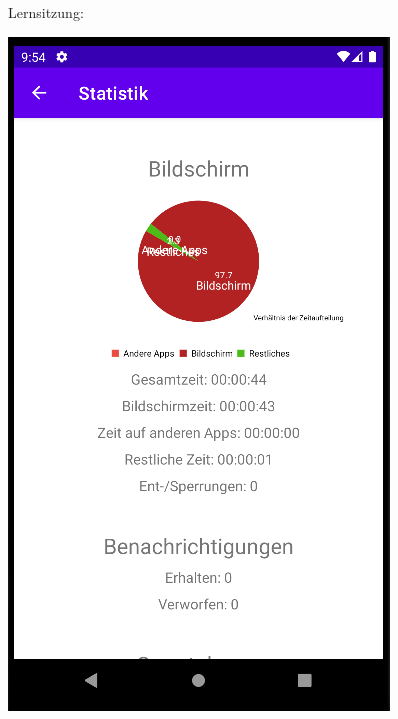 \documentclass[ngerman]{tutorial}
\begin{document}
\centering Lernsitzung:\nobreak
\begin{center}
    \includegraphics[scale=0.45]{stats_session_1.png}\quad

\end{center}
\end{document}
